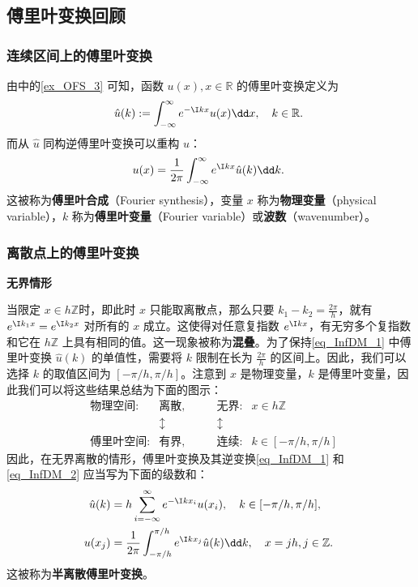 

\subsection{傅里叶变换回顾}
\subsubsection{连续区间上的傅里叶变换}
由中的\autoref{ex_OFS_3} 可知，函数 $u(x),x\in\mathbb R$ 的傅里叶变换定义为
\begin{equation}\label{eq_InfDM_1}
\hat u(k):=\int_{-\infty}^{\infty} e^{-\I kx}u(x)\dd x,\quad k\in\mathbb R.~
\end{equation}
而从 $\hat u$ 同构逆傅里叶变换可以重构 $u$：
\begin{equation}\label{eq_InfDM_2}
u(x)=\frac{1}{2\pi}\int_{-\infty}^{\infty} e^{\I kx}\hat u(k)\dd k.~
\end{equation}
这被称为\textbf{傅里叶合成}（Fourier synthesis），变量 $x$ 称为\textbf{物理变量}（physical variable），$k$ 称为\textbf{傅里叶变量}（Fourier variable）或\textbf{波数}（wavenumber）。

\subsubsection{离散点上的傅里叶变换}
\textbf{无界情形}

当限定 $x\in h\mathbb Z$时，即此时 $x$ 只能取离散点，那么只要 $k_1-k_2=\frac{2\pi}{h}$，就有 $e^{\I k_1x}=e^{\I k_2x}$ 对所有的 $x$ 成立。这使得对任意复指数 $e^{\I kx}$，有无穷多个复指数和它在 $h\mathbb Z$ 上具有相同的值。这一现象被称为\textbf{混叠}。为了保持\autoref{eq_InfDM_1} 中傅里叶变换 $\hat u(k)$ 的单值性，需要将 $k$ 限制在长为 $\frac{2\pi}{h}$ 的区间上。因此，我们可以选择 $k$ 的取值区间为 $[-\pi/h,\pi/h]$。注意到 $x$ 是物理变量，$k$ 是傅里叶变量，因此我们可以将这些结果总结为下面的图示：
\begin{equation}
\begin{aligned}
&\text{物理空间:}& \text{离散},&\qquad\text{无界:} &x\in h\mathbb Z\\
&&\updownarrow&\qquad\updownarrow&\\
&\text{傅里叶空间:}& \text{有界},&\qquad\text{连续:} &k\in [-\pi/h,\pi/h]
\end{aligned}~
\end{equation}
因此，在无界离散的情形，傅里叶变换及其逆变换\autoref{eq_InfDM_1} 和\autoref{eq_InfDM_2} 应当写为下面的级数和：
\begin{equation}\label{eq_InfDM_3}
\begin{aligned}
\hat u(k)&=h\sum_{i=-\infty}^{\infty}e^{-\I kx_i}u(x_i),\quad k\in[-\pi/h,\pi/h],\\
u(x_j)&=\frac{1}{2\pi}\int_{-\pi/h}^{\pi/h} e^{\I kx_j}\hat u(k)\dd k,\quad x=jh,j\in \mathbb Z.
\end{aligned}~
\end{equation}
这被称为\textbf{半离散傅里叶变换}。

